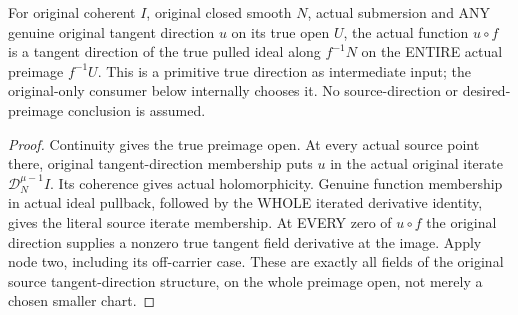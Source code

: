 \begin{theorem}
\label{hir:submersion-tangent-contact-whole-direction-preimage}
\leanok
For original coherent $I$, original closed smooth $N$, actual submersion and
ANY genuine original tangent direction $u$ on its true open $U$, the actual
function $u\circ f$ is a tangent direction of the true pulled ideal along
$f^{-1}N$ on the ENTIRE actual preimage $f^{-1}U$. This is a primitive true
direction as intermediate input; the original-only consumer below internally
chooses it. No source-direction or desired-preimage conclusion is assumed.
\end{theorem}
\begin{proof}
Continuity gives the true preimage open. At every actual source point there,
original tangent-direction membership puts $u$ in the actual original iterate
$\mathcal D_N^{\mu-1}I$. Its coherence gives actual holomorphicity. Genuine
function membership in actual ideal pullback, followed by the WHOLE iterated
derivative identity, gives the literal source iterate membership. At EVERY
zero of $u\circ f$ the original direction supplies a nonzero true tangent
field derivative at the image. Apply node two, including its off-carrier
case. These are exactly all fields of the original source tangent-direction
structure, on the whole preimage open, not merely a chosen smaller chart.
\end{proof}

